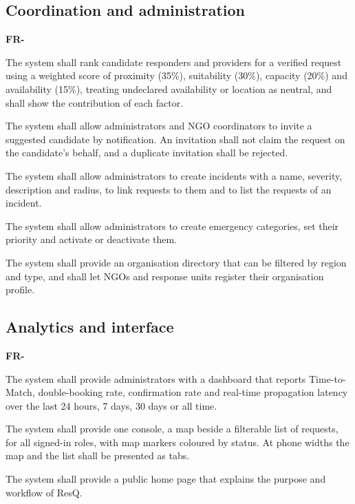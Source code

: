 \documentclass{scrreprt}
\newcounter{fr}
\newcounter{frsave}
\newenvironment{frlist}
  {\begin{list}{\textbf{FR-\arabic{fr}}}{\usecounter{fr}\setcounter{fr}{\value{frsave}}%
   \setlength{\labelwidth}{1.5cm}\setlength{\leftmargin}{1.8cm}%
   \setlength{\itemsep}{3pt}\setlength{\parsep}{2pt}}}
  {\setcounter{frsave}{\value{fr}}\end{list}}
\begin{document}
\subsection*{Coordination and administration}
\begin{frlist}
    \item The system shall rank candidate responders and providers for a verified request using a weighted score of proximity (35\%), suitability (30\%), capacity (20\%) and availability (15\%), treating undeclared availability or location as neutral, and shall show the contribution of each factor.
    \item The system shall allow administrators and NGO coordinators to invite a suggested candidate by notification. An invitation shall not claim the request on the candidate's behalf, and a duplicate invitation shall be rejected.
    \item The system shall allow administrators to create incidents with a name, severity, description and radius, to link requests to them and to list the requests of an incident.
    \item The system shall allow administrators to create emergency categories, set their priority and activate or deactivate them.
    \item The system shall provide an organisation directory that can be filtered by region and type, and shall let NGOs and response units register their organisation profile.
\end{frlist}

\subsection*{Analytics and interface}
\begin{frlist}
    \item The system shall provide administrators with a dashboard that reports Time-to-Match, double-booking rate, confirmation rate and real-time propagation latency over the last 24 hours, 7 days, 30 days or all time.
    \item The system shall provide one console, a map beside a filterable list of requests, for all signed-in roles, with map markers coloured by status. At phone widths the map and the list shall be presented as tabs.
    \item The system shall provide a public home page that explains the purpose and workflow of ResQ.
\end{frlist}
\end{document}
